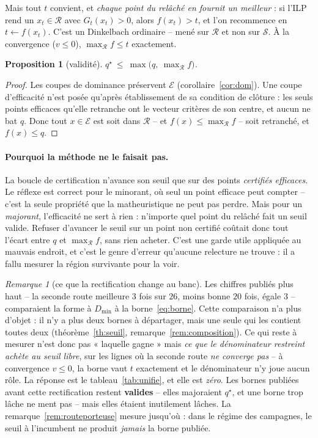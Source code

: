 \documentclass[11pt,a4paper]{article}
\theoremstyle{plain}
\newtheorem{proposition}[theorem]{Proposition}
\theoremstyle{remark}
\newtheorem{remark}{Remarque}
\newcommand{\Ecal}{\mathcal{E}}
\newcommand{\Scal}{\mathcal{S}}
\newcommand{\Rcal}{\mathcal{R}}
\newcommand{\qs}{q^{\star}}
\begin{document}
Mais tout $t$ convient, et
\emph{chaque point du relâché en fournit un meilleur} : si l'ILP rend un
$x_t\in\Rcal$ avec $G_t(x_t)>0$, alors $f(x_t)>t$, et l'on recommence en
$t\leftarrow f(x_t)$. C'est un Dinkelbach ordinaire -- mené sur $\Rcal$ et
non sur $\Scal$. À la convergence ($v\le 0$), $\max_{\Rcal}f\le t$
exactement.

\begin{proposition}[validité]
\label{prop:geomvalide}
$\qs\ \le\ \max\bigl(q,\ \max_{\Rcal}f\bigr)$.
\end{proposition}

\begin{proof}
Les coupes de dominance préservent $\Ecal$ (corollaire~\ref{cor:dom}).
Une coupe d'efficacité
n'est posée qu'après établissement de sa condition de clôture : les seuls
points efficaces qu'elle retranche ont le vecteur critères de son centre, et
aucun ne bat $q$. Donc tout $x\in\Ecal$ est soit dans $\Rcal$ -- et
$f(x)\le\max_{\Rcal}f$ -- soit retranché, et $f(x)\le q$. \end{proof}

\paragraph{Pourquoi la méthode ne le faisait pas.} La boucle de
certification n'avance son seuil que sur des points \emph{certifiés
efficaces}. Le réflexe est correct pour le minorant, où seul un point
efficace peut compter -- c'est la seule propriété que la matheuristique ne
peut pas perdre. Mais pour un \emph{majorant}, l'efficacité ne sert à rien :
n'importe quel point du relâché fait un seuil valide. Refuser d'avancer le
seuil sur un point non certifié coûtait donc tout l'écart entre $q$ et
$\max_{\Rcal}f$, sans rien acheter. C'est une garde utile appliquée au
mauvais endroit, et c'est le genre d'erreur qu'aucune relecture ne trouve :
il a fallu mesurer la région survivante pour la voir.

\begin{remark}[ce que la rectification change au banc]
Les chiffres publiés plus haut -- la seconde route meilleure $3$ fois sur
$26$, moins bonne $20$ fois, égale $3$ -- comparaient la forme à $D_{\min}$
à la borne~\eqref{eq:borne}. Cette comparaison n'a plus d'objet : il n'y a
plus deux bornes à départager, mais une seule qui les contient toutes deux
(théorème~\ref{th:seuil}, remarque~\ref{rem:composition}). Ce qui reste à
mesurer n'est donc pas « laquelle gagne » mais \emph{ce que le dénominateur
restreint achète au seuil libre}, sur les lignes où la seconde route
\emph{ne converge pas} -- à convergence $v\le 0$, la borne vaut $t$
exactement et le dénominateur n'y joue aucun rôle. La réponse est le
tableau~\ref{tab:unifie}, et elle est \emph{zéro}. Les bornes publiées avant
cette rectification
restent \textbf{valides} -- elles majoraient $\qs$, et une borne trop lâche
ne ment pas -- mais elles étaient inutilement lâches. La
remarque~\ref{rem:routeporteuse} mesure jusqu'où : dans le régime des
campagnes, le seuil à l'incumbent ne produit \emph{jamais} la borne
publiée.
\end{remark}
\end{document}
